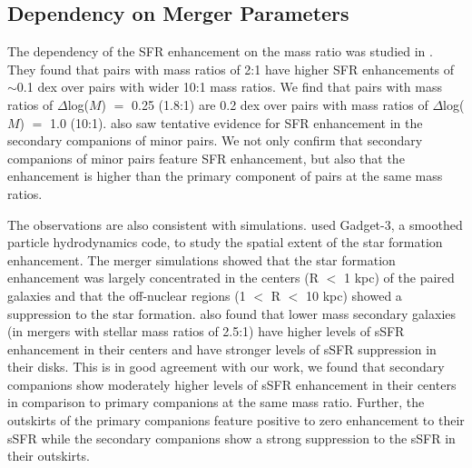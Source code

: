 \documentclass[iop,revtex4,twocolumn,apj,numberedappendix,appendixfloats]{emulateapj}
\begin{document}
\subsection{Dependency on Merger Parameters}

The dependency of the SFR enhancement on the mass ratio was studied in \citet{Ellison:2008}. They found that pairs with mass ratios of 2:1 have higher SFR enhancements of $\sim$0.1 dex over pairs with wider 10:1 mass ratios. We find that pairs with mass ratios of $\Delta$log($M$) $=$ 0.25 (1.8:1) are 0.2 dex over pairs with mass ratios of $\Delta$log($M$) $=$ 1.0 (10:1). \citet{Ellison:2008} also saw tentative evidence for SFR enhancement in the secondary companions of minor pairs. We not only confirm that secondary companions of minor pairs feature SFR enhancement, but also that the enhancement is higher than the primary component of pairs at the same mass ratios. 

The observations are also consistent with simulations. \citet{Moreno:2015} used {\sc Gadget}-3, a smoothed particle hydrodynamics code, to study the spatial extent of the star formation enhancement. The merger simulations showed that the star formation enhancement was largely concentrated in the centers (R $<$ 1 kpc) of the paired galaxies and that the off-nuclear regions (1 $<$ R $<$ 10 kpc) showed a suppression to the star formation. \citet{Moreno:2015} also found that lower mass secondary galaxies (in mergers with stellar mass ratios of 2.5:1) have higher levels of sSFR enhancement in their centers and have stronger levels of sSFR suppression in their disks. This is in good agreement with our work, we found that secondary companions show moderately higher levels of sSFR enhancement in their centers in comparison to primary companions at the same mass ratio. Further, the outskirts of the primary companions feature positive to zero enhancement to their sSFR while the secondary companions show a strong suppression to the sSFR in their outskirts. 
\end{document}
